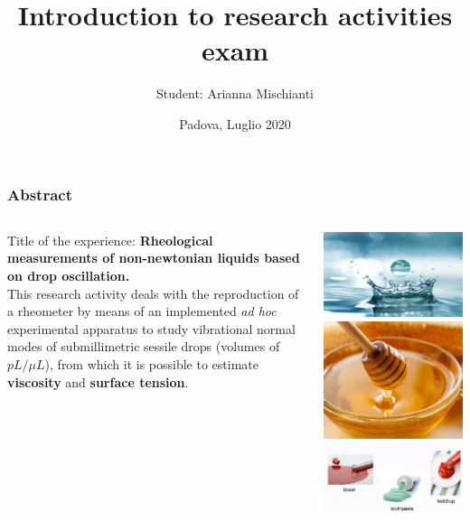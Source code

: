 \documentclass[xcolor=table]{beamer}
\title[Introduction to research activities]{Introduction to research activities exam} %
\author{Student: Arianna Mischianti} %
\institute[] %
{Supervisors: \\
\emph{Prof.} G. Mistura \\ 
\emph{Dott.} P. Sartori \\%
\medskip 
\textit{University of Padova} %
}
\date{Padova, Luglio 2020} %
\begin{document}
	
	\begin{frame}
	\centering \titlepage 
\end{frame}

\begin{frame}
\frametitle{Abstract} 
\fontsize{11}{12.2} \selectfont
\begin{columns}
	\begin{column}{.4\textwidth}
		Title of the experience: \textbf{Rheological measurements of non-newtonian liquids based on drop oscillation.}\\
		\medskip
		\fontsize{10}{12.2} \selectfont
		This research activity deals with the reproduction of a rheometer  by means of an implemented \textit{ad hoc} experimental apparatus to study vibrational normal modes of submillimetric sessile drops (volumes of $pL/\mu L$), from which it is possible to estimate \textbf{viscosity} and \textbf{surface tension}.\\
\end{column}
\begin{column}{.6\textwidth}
\centering
\includegraphics[width=0.35\columnwidth]{acqua.PNG}
\includegraphics[width=0.35\columnwidth]{miele.PNG}\\
\includegraphics[width=0.7\columnwidth]{nonnewtesempi.PNG}\\

\end{column}
\end{columns}
\end{frame}
\end{document}
